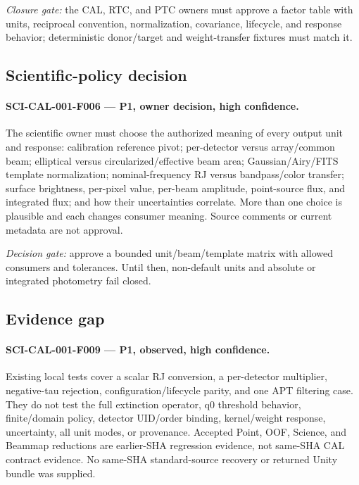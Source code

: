 \documentclass[11pt]{article}
\begin{document}
\emph{Closure gate:} the CAL, RTC, and PTC owners must approve a factor table
with units, reciprocal convention, normalization, covariance, lifecycle, and
response behavior; deterministic donor/target and weight-transfer fixtures
must match it.

\subsection{Scientific-policy decision}

\paragraph{SCI-CAL-001-F006 --- P1, owner decision, high confidence.}
The scientific owner must choose the authorized meaning of every output unit
and response: calibration reference pivot; per-detector versus array/common
beam; elliptical versus circularized/effective beam area; Gaussian/Airy/FITS
template normalization; nominal-frequency RJ versus bandpass/color transfer;
surface brightness, per-pixel value, per-beam amplitude, point-source flux,
and integrated flux; and how their uncertainties correlate.  More than one
choice is plausible and each changes consumer meaning.  Source comments or
current metadata are not approval.

\emph{Decision gate:} approve a bounded unit/beam/template matrix with allowed
consumers and tolerances.  Until then, non-default units and absolute or
integrated photometry fail closed.

\subsection{Evidence gap}

\paragraph{SCI-CAL-001-F009 --- P1, observed, high confidence.}
Existing local tests cover a scalar RJ conversion, a per-detector multiplier,
negative-tau rejection, configuration/lifecycle parity, and one APT filtering
case.  They do not test the full extinction operator, q0 threshold behavior,
finite/domain policy, detector UID/order binding, kernel/weight response,
uncertainty, all unit modes, or provenance.  Accepted Point, OOF, Science, and
Beammap reductions are earlier-SHA regression evidence, not same-SHA CAL
contract evidence.  No same-SHA standard-source recovery or returned Unity
bundle was supplied.
\end{document}
